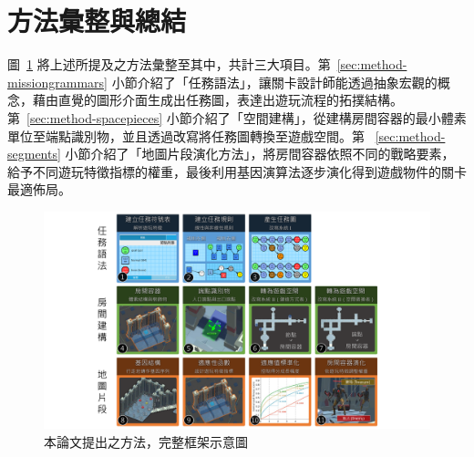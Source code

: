 \section{方法彙整與總結}
\label{sec:method-summary}

圖~\ref{fig:completed-framework} 將上述所提及之方法彙整至其中，共計三大項目。第~\ref{sec:method-missiongrammars} 小節介紹了「任務語法」，讓關卡設計師能透過抽象宏觀的概念，藉由直覺的圖形介面生成出任務圖，表達出遊玩流程的拓撲結構。第~\ref{sec:method-spacepieces} 小節介紹了「空間建構」，從建構房間容器的最小體素單位至端點識別物，並且透過改寫將任務圖轉換至遊戲空間。第 ~\ref{sec:method-segments} 小節介紹了「地圖片段演化方法」，將房間容器依照不同的戰略要素，給予不同遊玩特徵指標的權重，最後利用基因演算法逐步演化得到遊戲物件的關卡最適佈局。

\begin{landscape}
  \begin{figure}[!htb]
    \begin{center}
      \includegraphics[width=1.0\linewidth]{figures/completed-framework.pdf}
      \caption{本論文提出之方法，完整框架示意圖} 
      \label{fig:completed-framework}
    \end{center}
  \end{figure}
\end{landscape}